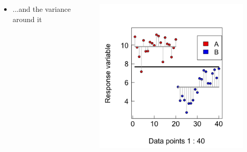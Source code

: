 \documentclass{beamer}
\begin{document}
\begin{frame}{}
  \begin{columns}[onlytextwidth] %
    \begin{column}{0.44\textwidth}
  \begin{itemize}
    \item ...and the variance around it
  \end{itemize}
    \end{column}
    \hspace{0.02\textwidth} %
    \begin{column}{0.6\textwidth}
      \begin{center}
        \includegraphics[width=0.9\textwidth]{lectures/day_1_intro_to_mems/figures/unnamed-chunk-22-1.png}
      \end{center}
    \end{column}
  \end{columns}
\end{frame}
\end{document}
